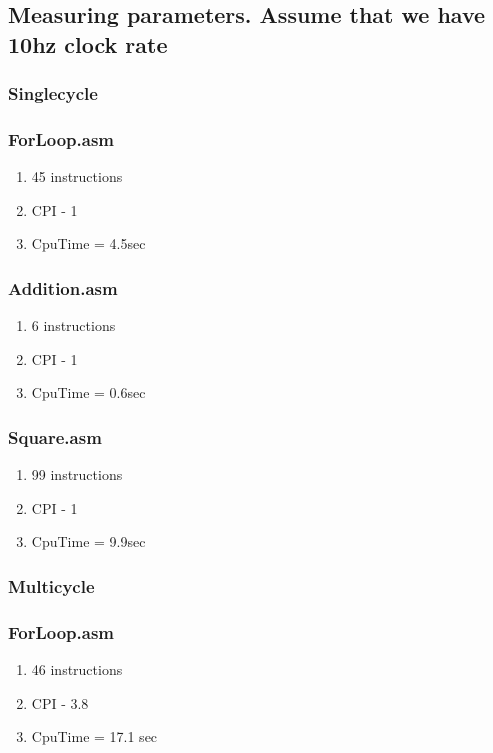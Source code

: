 \documentclass[10pt]{article}
\begin{document}
\subsection{Measuring parameters. Assume that we have 10hz clock rate}
	\subsubsection{Singlecycle}
		\subsubsection{ForLoop.asm}
		\begin{enumerate}
			\item 45 instructions
			\item CPI - 1
			\item CpuTime = 4.5sec

		\end{enumerate}
		\subsubsection{Addition.asm}
		\begin{enumerate}
			\item 6 instructions
			\item CPI - 1
			\item CpuTime = 0.6sec
			
		\end{enumerate}
		\subsubsection{Square.asm}
		\begin{enumerate}
			\item 99 instructions
			\item CPI - 1
			\item CpuTime = 9.9sec
			
		\end{enumerate}

	\subsubsection{Multicycle}
		\subsubsection{ForLoop.asm}
		\begin{enumerate}
			\item 46 instructions
			\item CPI - 3.8
			\item CpuTime = 17.1 sec

		\end{enumerate}
\end{document}
